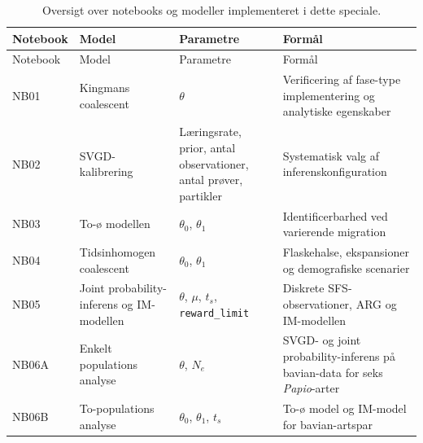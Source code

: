 \documentclass[
  10pt,
  a4paper,
]{scrbook}
\let\oldemph\emph
\renewcommand\emph[1]{\oldemph{\color{gray}#1}}
\begin{document}
\begin{longtable}[]{@{}
  >{\raggedright\arraybackslash}p{}
  >{\raggedright\arraybackslash}p{}
  >{\raggedright\arraybackslash}p{}
  >{\raggedright\arraybackslash}p{}@{}}
\caption{Oversigt over notebooks og modeller implementeret i dette
speciale.}\label{tbl-notebooks}\tabularnewline
\toprule\noalign{}
\begin{minipage}[b]{\linewidth}\raggedright
Notebook
\end{minipage} & \begin{minipage}[b]{\linewidth}\raggedright
Model
\end{minipage} & \begin{minipage}[b]{\linewidth}\raggedright
Parametre
\end{minipage} & \begin{minipage}[b]{\linewidth}\raggedright
Formål
\end{minipage} \\
\midrule\noalign{}
\endfirsthead
\toprule\noalign{}
\begin{minipage}[b]{\linewidth}\raggedright
Notebook
\end{minipage} & \begin{minipage}[b]{\linewidth}\raggedright
Model
\end{minipage} & \begin{minipage}[b]{\linewidth}\raggedright
Parametre
\end{minipage} & \begin{minipage}[b]{\linewidth}\raggedright
Formål
\end{minipage} \\
\midrule\noalign{}
\endhead
\bottomrule\noalign{}
\endlastfoot
NB01 & Kingmans coalescent & \(\theta\) & Verificering af fase-type
implementering og analytiske egenskaber \\
NB02 & SVGD-kalibrering & Læringsrate, prior, antal observationer, antal
prøver, partikler & Systematisk valg af inferenskonfiguration \\
NB03 & To-ø modellen & \(\theta_0\), \(\theta_1\) & Identificerbarhed
ved varierende migration \\
NB04 & Tidsinhomogen coalescent & \(\theta_0\), \(\theta_1\) &
Flaskehalse, ekspansioner og demografiske scenarier \\
NB05 & Joint probability-inferens og IM-modellen & \(\theta\), \(\mu\),
\(t_s\), \texttt{reward\_limit} & Diskrete SFS-observationer, ARG og
IM-modellen \\
NB06A & Enkelt populations analyse & \(\theta\), \(N_e\) & SVGD- og
joint probability-inferens på bavian-data for seks \emph{Papio}-arter \\
NB06B & To-populations analyse & \(\theta_0\), \(\theta_1\), \(t_s\) &
To-ø model og IM-model for bavian-artspar \\
\end{longtable}
\end{document}
